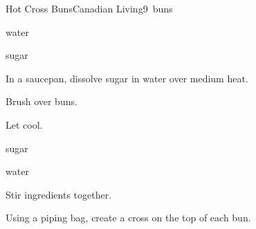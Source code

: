 \begin{recipe}{Hot Cross Buns}{Canadian Living}{9~buns}
\begin{ingredients}
\item {} water
\item {} sugar
\end{ingredients}

\begin{directions}
\item In a saucepan, dissolve sugar in water over medium heat.
\item Brush over buns.
\item Let cool.
\end{directions}

\begin{ingredients}
\item \C{\half} sugar
\item {} water
\end{ingredients}

\begin{directions}
\item Stir ingredients together.
\item Using a piping bag, create a cross on the top of each bun.
\end{directions}

\end{recipe}
